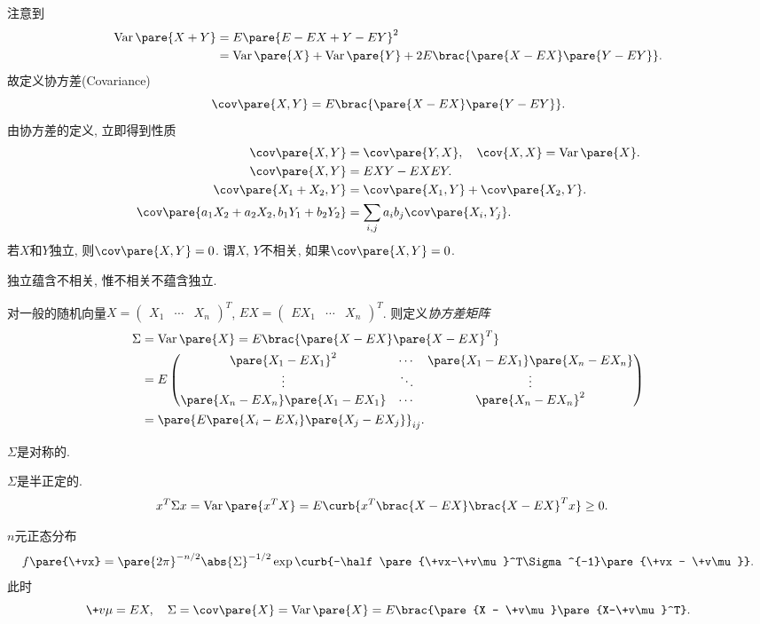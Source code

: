 \documentclass{ctexart}
\DeclareMathOperator{\Var}{Var}
\begin{document}
注意到
\begin{align*}
    \Var\pare{X+Y} &= E\pare{E-EX+Y-EY}^2\\ &= \Var\pare{X} + \Var\pare{Y} + 2E\brac{\pare{X-EX}\pare{Y-EY}}.
\end{align*}
故定义协方差(Covariance)
\[ \cov\pare{X,Y} = E\brac{\pare{X-EX}\pare{Y-EY}}. \]
由协方差的定义, 立即得到性质
\begin{align*}
    \cov\pare{X,Y} &= \cov\pare{Y,X},\quad \cov{X,X} = \Var\pare{X}. \\
    \cov\pare{X,Y} &= EXY - EXEY. \\
    \cov\pare{X_1 + X_2, Y} &= \cov\pare{X_1,Y} + \cov\pare{X_2,Y}. \\
    \cov\pare{a_1X_2 + a_2X_2, b_1Y_1 + b_2Y_2} &= \sum_{i,j} a_ib_j\cov\pare{X_i,Y_j}.
\end{align*}
若$X$和$Y$独立, 则$\cov\pare{X,Y}= 0$. 谓$X$, $Y$不相关, 如果$\cov\pare{X,Y} = 0$.
\begin{pitfall}
    独立蕴含不相关, 惟不相关不蕴含独立.
\end{pitfall}
对一般的随机向量$X = \begin{pmatrix}
    X_1  & \cdots & X_n
\end{pmatrix}^T$, $EX = \begin{pmatrix}
    EX_1 & \cdots & X_n
\end{pmatrix}^T$. 则定义\emph{协方差矩阵}
\begin{align*}
    \Sigma &= \Var\pare{X} = E\brac{\pare{X-EX}\pare{X-EX}^T} \\
    &= E \begin{pmatrix}
    \pare{X_1 - EX_1}^2 & \cdots & \pare{X_1 - EX_1} \pare{X_n - EX_n} \\
    \vdots & \ddots & \vdots \\
    \pare{X_n-EX_n}\pare{X_1 - EX_1} & \cdots & \pare{X_n - EX_n}^2
    \end{pmatrix} \\
    &= \pare{E\pare{X_i - EX_i}\pare{X_j - EX_j}}_{ij}.
\end{align*}
\begin{cenum}
    \item $\Sigma$是对称的.
    \item $\Sigma$是半正定的.
    \begin{align*}
        x^T \Sigma x &= \Var\pare{x^T X} = E\curb{x^T\brac{X-EX}\brac{X-EX}^T x} \ge 0.
    \end{align*}
\end{cenum}
\begin{sample}
    \begin{ex}
        $n$元正态分布
        \[ f\pare{\+vx} = \pare{2\pi}^{-n/2}\abs{\Sigma}^{-1/2} \exp\curb{-\half \pare{\+vx-\+v\mu}^T\Sigma^{-1}\pare{\+vx - \+v\mu}}. \]
        此时
        \[ \+v\mu = EX,\quad \Sigma = \cov\pare{X} = \Var\pare{X} = E\brac{\pare{X - \+v\mu}\pare{X-\+v\mu}^T}. \]
    \end{ex}
\end{sample}
\end{document}
